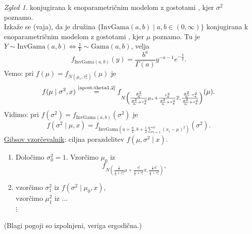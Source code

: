 \documentclass[a4paper, 12pt]{book}
\theoremstyle{definition}
\theoremstyle{remark}
\newtheorem*{exmp}{Zgled}
\begin{document}
\begin{exmp}
  konjugirana k enoparametričnim modelom z gostotami , kjer $\sigma^2$ poznamo. \\
  Izkaže se (vaja), da je družina $\{\text{InvGama}(a,b) \mid a,b \in (0, \infty)\}$
  konjugirana k enoparametričnim modelom z gostotami , kjer $\mu$ poznamo.
  Tu je $Y \sim \text{InvGama}(a,b) \iff \frac{1}{Y} \sim \text{Gama}(a,b)$, velja
  \begin{equation*}
    f_{\text{InvGama}(a,b)}(y) = \frac{b^a}{\Gamma(a)} y^{-a-1} e^{-\frac{b}{y}}.
  \end{equation*}
  Vemo: pri $f(\mu) = f_{N(\mu_{*}, \tau_{*}^2)}(\mu)$ je
  \begin{equation*}
    f(\mu \mid \sigma^2, x) \stackrel{\refeq{apost-theta1,2}}{=}
      f_{N\left(\frac{\frac{\sigma^2}{n}}{\frac{\sigma^2}{n} + \tau_{*}^2} \mu_{*} + 
                \frac{\tau_{*}^2}{\frac{\sigma^2}{n} + \tau_{*}^2} \overline{x},
                \frac{\frac{\sigma^2}{n} \cdot \tau_{*}^2}{\frac{\sigma^2}{n} + \tau_{*}^2}\right)}(\mu).
  \end{equation*}
  Vidimo: pri $f(\sigma^2) = f_{\text{InvGama}(a,b)}(\sigma^2)$ je
  \begin{equation*}
    f(\sigma^2 \mid \mu, x) =
      f_{\text{InvGama}\left(a+\frac{n}{2}, b+\frac{1}{2}\sum_{i=1}^{n}(x_i-\mu)^2\right)}(\sigma^2).
  \end{equation*}
  \underline{Gibsov vzorčevalnik}: ciljna porazdelitev $f(\mu, \sigma^2 \mid x)$.
  \begin{enumerate}[label=(\roman*)]
    \item Določimo $\sigma_0^2 = 1$. Vzorčimo $\mu_0$ iz
      \begin{equation*}
        f_{N\left(\frac{\frac{1}{n}}{\frac{1}{n} + \tau_{*}^2} \mu +
                  \frac{\tau_{*}^2}{\frac{1}{n} + \tau_{*}^2} \overline{x},
                  \frac{\frac{1}{n} \tau_{*}^2}{\frac{1}{n} + \tau_{*}^2}\right)},
      \end{equation*}
    \item vzorčimo $\sigma_1^2$ iz $f(\sigma^2 \mid \mu_0, x)$, \\
      vzorčimo $\mu_1^2$ iz $\dots$ \\
      $\vdots$
  \end{enumerate}
  (Blagi pogoji so izpolnjeni, veriga ergodična.)
\end{exmp}



%
%



\end{document}

